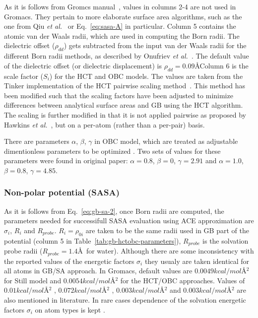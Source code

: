 \documentclass[11pt]{book}
\begin{document}
As it is follows from Gromcs manual~\cite{GromacsManual}, values in columns 2-4 are not used in Gromacs. They pertain to more elaborate surface area algorithms, such as the one from Qiu {\em et al.}~\cite{QiuJPC97} or Eq.~\ref{eq:sasa-A} in particular. Column 5 contains the atomic van der Waals radii, which are used in computing the Born radii. The dielectric offset ($\rho_{dd}$) gets subtracted from the input van der Waals radii for the different Born radii methods, as described by Onufriev {\em et al.}~\cite{OnufrievProteins04}. The default value of the dielectric offset (or dielectric displacement) is $\rho_{dd}=0.09$\AA  Column 6 is the scale factor ($S_{i}$) for the HCT and OBC models. The values are taken from the Tinker implementation of the HCT pairwise scaling method~\cite{HawkinsJPC96}.  This method has been modified such that the scaling factors have been adjusted to minimize differences between analytical surface areas and GB using the HCT algorithm.  The scaling is further modified in that it is not applied pairwise as proposed by Hawkins {\em et al.}~\cite{HawkinsJPC96}, but on a per-atom (rather than a per-pair) basis.

There are parameters $\alpha$, $\beta$, $\gamma$ in OBC model, which are treated as adjustable dimentionless parameters to be optimized \cite{OnufrievProteins04}. Two sets of values for these parameters were found in original paper: $\alpha=0.8$, $\beta=0$, $\gamma=2.91$ and $\alpha=1.0$, $\beta=0.8$, $\gamma=4.85$.


\subsubsection{Non-polar potential (SASA)}

As it is follows from Eq.~\ref{eq:gb-sa-2}, once Born radii are computed, the parameters needed for successifull SASA evaluation using ACE approximation are $\sigma_{i}$, $R_{i}$ and $R_{probe}$. $R_{i}=\rho_{0i}$ are taken to be the same radii used in GB part of the potential (column 5 in Table~\ref{tab:gb-hctobc-parameters}), $R_{probe}$ is the solvation probe radii ($R_{probe}=1.4$\AA~for water). Although there are some inconsistency with the reported values of the energetic factors $\sigma_{i}$ they usualy are taken identical for all atoms in GB/SA approach. In Gromacs, default values are $0.0049$$kcal/mol$\AA$^2$ for Still model and $0.0054$$kcal/mol$\AA$^2$ for the HCT/OBC approaches. Values of $0.01$$kcal/mol$\AA$^2$ \cite{QiuJPC97}, $0.072$$kcal/mol$\AA$^2$ \cite{StillJACS90}, $0.003$$kcal/mol$\AA$^2$ and $0.003$$kcal/mol$\AA$^2$ \cite{SchaeferJMB90}  are also mentioned in literature. In rare cases dependence of the solvation energetic factors $\sigma_{i}$ on atom types is kept \cite{HawkinsCPL95}.
\end{document}
